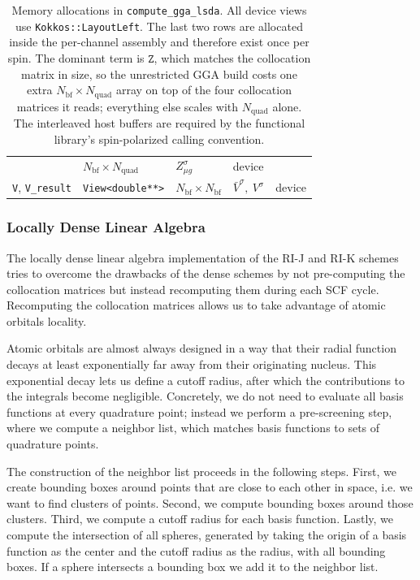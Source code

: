 \documentclass{article}
\begin{document}
\begin{table}[H]
{\begin{tabular}{@{}llllc@{}}
      & $N_\text{bf}\times N_\text{quad}$ & $Z^\sigma_{\mu g}$ & device \\
      \texttt{V}, \texttt{V\_result} & \texttt{View<double**>}
      & $N_\text{bf}\times N_\text{bf}$ & $\bar V^\sigma,\ V^\sigma$ & device \\
      \bottomrule
  \end{tabular}}
  \caption{Memory allocations in \texttt{compute\_gga\_lsda}. All device
    views use \texttt{Kokkos::LayoutLeft}. The last two rows are
    allocated inside
    the per-channel assembly and therefore exist once per spin. The
    dominant term is $\texttt{Z}$, which matches the collocation matrix
    in size, so the unrestricted GGA build costs one extra
    $N_\text{bf}\times N_\text{quad}$ array on top of the four
    collocation matrices it reads; everything else scales with
    $N_\text{quad}$ alone. The interleaved host buffers are required by
    the functional library's spin-polarized calling
  convention.}
  \label{tab:gga_lsda_memory}
\end{table}

\subsubsection{Locally Dense Linear
Algebra}\label{subsubsec:locally_dense_la}

The locally dense linear algebra implementation of the RI-J and RI-K
schemes tries to overcome the drawbacks of the dense schemes by not
pre-computing the collocation matrices but instead recomputing them
during each SCF cycle. Recomputing the collocation matrices allows us
to take advantage of atomic orbitals locality.

Atomic orbitals are almost always designed in a way that their radial
function decays at least exponentially far away from their originating
nucleus. This exponential decay lets us define a cutoff radius,
after which the contributions to the integrals become negligible.
Concretely, we do not need to evaluate all basis functions at
every quadrature point; instead we perform a pre-screening
step, where we compute a neighbor list, which matches basis functions to
sets of quadrature points.

The construction of the neighbor list proceeds in the following
steps. First, we create bounding boxes around points that are close to
each other in space, i.e. we want to find clusters of points. Second,
we compute bounding boxes around those clusters. Third, we compute a
cutoff radius for each basis function. Lastly, we compute the
intersection of all spheres, generated by taking the origin of a basis
function as the center and the cutoff radius as the radius, with all
bounding boxes. If a sphere intersects a bounding box we add it to the
neighbor list.
\end{document}
